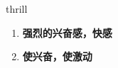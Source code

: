 
\begin{frame}
{\huge thrill}
\begin{center}
\begin{enumerate}\Large
  \item \textbf{强烈的兴奋感，快感}
  \item \textbf{使兴奋，使激动}
\end{enumerate}
\end{center}
\end{frame}
